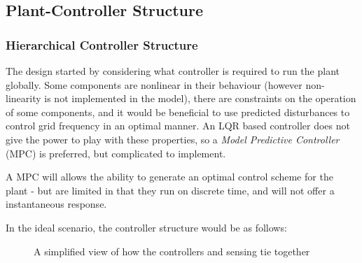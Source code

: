\subsection{Plant-Controller Structure}
\subsubsection{Hierarchical Controller Structure}

The design started by considering what controller is required to run the plant globally. 
Some components are nonlinear in their behaviour (however non-linearity is not implemented in the model), there are constraints on the operation of some components, and it would be beneficial to use predicted disturbances to control grid frequency in an optimal manner.
An LQR based controller does not give the power to play with these properties, so a \emph{Model Predictive Controller} (MPC) is preferred, but complicated to implement.

A MPC will allows the ability to generate an optimal control scheme for the plant - but are limited in that they run on discrete time, and will not offer a instantaneous response.

\newpage

In the ideal scenario, the controller structure would be as follows:

\begin{figure}[thb]
        \centering
\usetikzlibrary{arrows}
        \caption{A simplified view of how the controllers and sensing tie together} \label{fig:schematic}
\end{figure}


